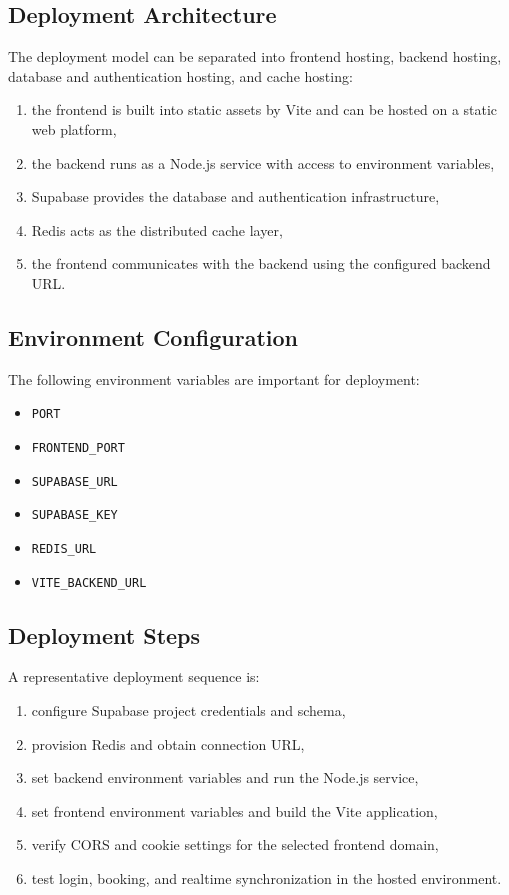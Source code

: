 \documentclass[12pt,onecolumn]{IEEEtran}
\begin{document}
\subsection{Deployment Architecture}
The deployment model can be separated into frontend hosting, backend hosting, database and authentication hosting, and cache hosting:
\begin{enumerate}
    \item the frontend is built into static assets by Vite and can be hosted on a static web platform,
    \item the backend runs as a Node.js service with access to environment variables,
    \item Supabase provides the database and authentication infrastructure,
    \item Redis acts as the distributed cache layer,
    \item the frontend communicates with the backend using the configured backend URL.
\end{enumerate}

\subsection{Environment Configuration}
The following environment variables are important for deployment:
\begin{itemize}
    \item \texttt{PORT}
    \item \texttt{FRONTEND\_PORT}
    \item \texttt{SUPABASE\_URL}
    \item \texttt{SUPABASE\_KEY}
    \item \texttt{REDIS\_URL}
    \item \texttt{VITE\_BACKEND\_URL}
\end{itemize}

\subsection{Deployment Steps}
A representative deployment sequence is:
\begin{enumerate}
    \item configure Supabase project credentials and schema,
    \item provision Redis and obtain connection URL,
    \item set backend environment variables and run the Node.js service,
    \item set frontend environment variables and build the Vite application,
    \item verify CORS and cookie settings for the selected frontend domain,
    \item test login, booking, and realtime synchronization in the hosted environment.
\end{enumerate}
\end{document}
